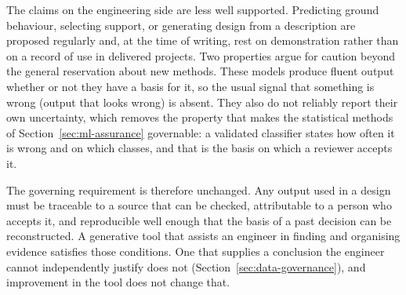 The claims on the engineering side are less well supported. Predicting ground
behaviour, selecting support, or generating design from a description are
proposed regularly and, at the time of writing, rest on demonstration rather
than on a record of use in delivered projects. Two properties argue for
caution beyond the general reservation about new methods. These models produce
fluent output whether or not they have a basis for it, so the usual signal
that something is wrong (output that looks wrong) is absent. They also do
not reliably report their own uncertainty, which removes the property that
makes the statistical methods of Section~\ref{sec:ml-assurance}
governable: a validated classifier states how often it is wrong and on which classes,
and that is the basis on which a reviewer accepts it.

The governing requirement is therefore unchanged. Any output used in a design must be traceable to a
source that can be checked, attributable to a person who accepts it, and
reproducible well enough that the basis of a past decision can be
reconstructed. A generative tool that assists an engineer in finding and
organising evidence satisfies those conditions. One that supplies
a conclusion the engineer cannot independently justify does not
(Section~\ref{sec:data-governance}), and improvement in the tool does not
change that.

\chapterreferences
